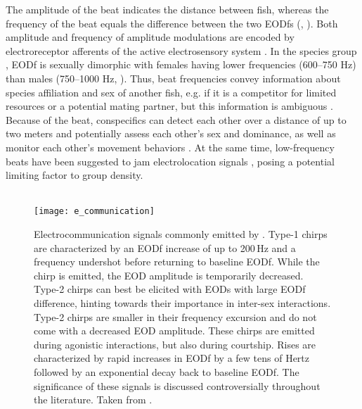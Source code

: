 The amplitude of the beat indicates the distance between fish, whereas the frequency of the beat equals the difference between the two EODfs (\citealp{Henninger2020}, ). Both amplitude and frequency of amplitude modulations are encoded by electroreceptor afferents of the active electrosensory system \citep{Benda2006, Hupe2008b, Walz2014}. In the \lepto{} species group \citep{DeSantana2013}, EODf is sexually dimorphic with females having lower frequencies (600--750 Hz) than males (750--1000 Hz, \citealp{Meyer1987}). Thus, beat frequencies convey information about species affiliation and sex of another fish, e.g. if it is a competitor for limited resources or a potential mating partner, but this information is ambiguous \citep{Henninger2018, Henninger2020}. Because of the beat, conspecifics can detect each other over a distance of up to two meters \citep{Knudsen1975, Henninger2018, Henninger2020} and potentially assess each other's sex and dominance, as well as monitor each other's movement behaviors \citep{Davies1978, Fernald2014}. At the same time, low-frequency beats have been suggested to jam electrolocation signals \citep{Bastian1987}, posing a potential limiting factor to group density.

\begin{figure}[tp]
  \begin{minipage}[t]{0.45\textwidth}\mbox{}\\[-2ex]
    \texttt{[image: e\_communication]}
  \end{minipage}
  \hfill
  \begin{minipage}[t]{0.35\textwidth}
  \caption{\label{e_com_sigs} Electrocommunication signals commonly emitted by \lepto{}.  Type-1 chirps are characterized by an EODf increase of up to 200\,Hz and a frequency undershot before returning to baseline EODf. While the chirp is emitted, the EOD amplitude is temporarily decreased. Type-2 chirps can best be elicited with EODs with large EODf difference, hinting towards their importance in inter-sex interactions.  Type-2 chirps are smaller in their frequency excursion and do not come with a decreased EOD amplitude. These chirps are emitted during agonistic interactions, but also during courtship.  Rises are characterized by rapid increases in EODf by a few tens of Hertz followed by an exponential decay back to baseline EODf. The significance of these signals is discussed controversially throughout the literature. Taken from \citet{Zupanc2002}.}
  \end{minipage}
\end{figure}

